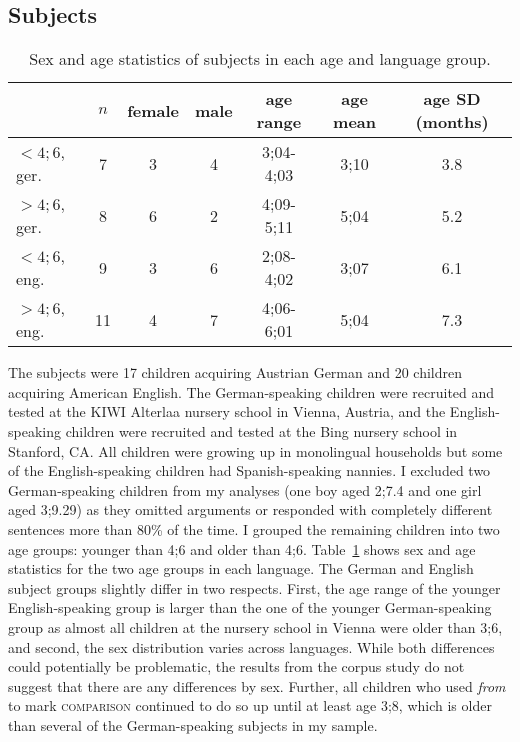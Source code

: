 \documentclass[lucida]{sp} %
\begin{document}
\subsection{Subjects}

\begin{table}
\begin{tabularx}{\textwidth}{l | c | c |  c | c | c | c  }
& $n$ & female & male & age range & age mean  & age SD (months) \\ \hline
$<4;6$, ger. &  7  & 3 & 4  & 3;04-4;03  & 3;10 & 3.8 \\
$>4;6$, ger. &  8  & 6 & 2 & 4;09-5;11  & 5;04  & 5.2 \\
$<4;6$, eng. &  9  & 3 & 6 & 2;08-4;02  & 3;07 & 6.1 \\
$>4;6$, eng. & 11 & 4 & 7 & 4;06-6;01  & 5;04 & 7.3 \\
\end{tabularx}
\caption{Sex and age statistics of subjects in each age and language group.}\label{tbl:subjects}
\end{table}

The subjects were 17 children acquiring Austrian German and 20 children acquiring American English. The German-speaking children were recruited and tested at the KIWI Alterlaa nursery school in Vienna, Austria, and the English-speaking children were recruited and tested at the Bing nursery school in Stanford, CA. All children were growing up in monolingual households but some of the English-speaking children had Spanish-speaking nannies. I excluded two German-speaking children from my analyses (one boy aged 2;7.4 and one girl aged 3;9.29) as they omitted arguments or responded with completely different sentences more than 80\% of the time. I grouped the remaining children into two age groups: younger than 4;6 and older than 4;6. Table~\ref{tbl:subjects} shows sex and age statistics for the two age groups in each language. The German and English subject groups slightly differ in two respects. First, the age range of the younger English-speaking group is larger than the one of the younger German-speaking group as almost all children at the nursery school in Vienna were older than 3;6, and second, the sex distribution varies across languages. While both differences could potentially be problematic, the results from the corpus study do not suggest that there are  any differences by sex. Further, all children who used \textit{from} to mark \textsc{comparison} continued to do so up until at least age 3;8, which is older than several of the German-speaking subjects in my sample.
\end{document}
